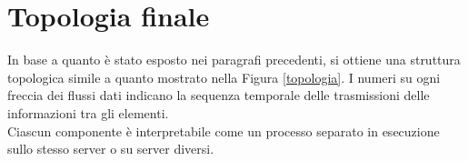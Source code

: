 \section{Topologia finale}
In base a quanto è stato esposto nei paragrafi precedenti, si ottiene una struttura topologica simile a quanto mostrato nella Figura \ref{topologia}. 
I numeri su ogni freccia dei flussi dati indicano la sequenza temporale delle trasmissioni delle informazioni tra gli elementi. 
\\Ciascun componente è interpretabile come un processo separato in esecuzione sullo stesso server o su server diversi. 
